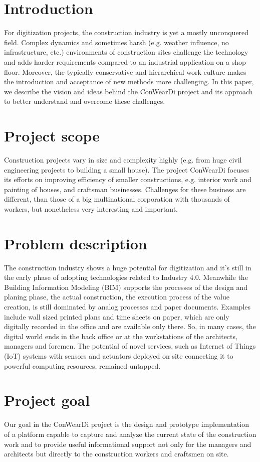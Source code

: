 \section{Introduction}
For digitization projects, the construction industry is yet a mostly unconquered field.
Complex dynamics and sometimes harsh (e.g. weather influence, no infrastructure, etc.) environments of construction sites challenge the technology and adds harder requirements compared to an industrial application on a shop floor. 
Moreover, the typically conservative and hierarchical work culture makes the introduction and acceptance of new methods more challenging. In this paper, we describe the vision and ideas behind the ConWearDi project and its approach to better understand and overcome these challenges.

\section{Project scope}
Construction projects vary in size and complexity highly (e.g. from huge civil engineering projects to building a small house). 
The project ConWearDi focuses its efforts on improving efficiency of smaller constructions, e.g. interior work and painting of houses, and craftsman businesses.
Challenges for these business are different, than those of a big multinational corporation with thousands of workers, but nonetheless very interesting and important.

\section{Problem description}
The construction industry shows a huge potential for digitization and it's still in the early phase of adopting technologies related to Industry 4.0. 
Meanwhile the Building Information Modeling (BIM) supports the processes of the design and planing phase, the actual construction, the execution process of the value creation, is still dominated by analog processes and paper documents. 
Examples include wall sized printed plans and time sheets on paper, which are only digitally recorded in the office and are available only there. 
So, in many cases, the digital world ends in the back office or at the workstations of the architects, managers and foremen. 
The potential of novel services, such as Internet of Things (IoT) systems with sensors and actuators deployed on site connecting it to powerful computing resources, remained untapped.

\section{Project goal}
Our goal in the ConWearDi project is the design and prototype implementation of a platform capable to capture and analyze the current state of the construction work and to provide useful informational support not only for the managers and architects but directly to the construction workers and craftsmen on site. 

